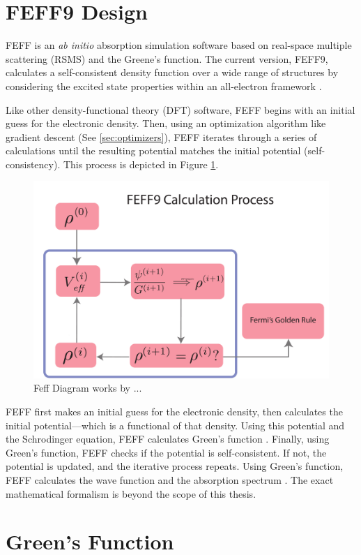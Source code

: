 \section{FEFF9 Design}

FEFF is an \textit{ab initio} absorption simulation software based on real-space multiple scattering (RSMS) and the Greene's function. The current version, FEFF9, calculates a self-consistent density function over a wide range of structures by considering the excited state properties within an
all-electron framework \cite{feff-new-dev}. 

Like other density-functional theory (DFT) software, FEFF begins with an initial guess for the electronic density. Then, using an optimization algorithm like gradient descent (See \ref{sec:optimizers}), FEFF iterates through a series of calculations until the resulting potential matches the initial potential (self-consistency). This process is depicted in Figure \ref{fig:feff-dft-diagram}.

\begin{figure}
    \centering
    \includegraphics[width=\linewidth]{Chapters/Figures/dft-feff-diagram.pdf}
    \caption[FEFF Diagram]{Feff Diagram works by ...}
    \label{fig:feff-dft-diagram}
\end{figure}

FEFF first makes an initial guess for the electronic density, then calculates the initial potential---which is a functional of that density. Using this potential and the Schrodinger equation, FEFF calculates Green's function \cite{greens-function-xafs-2021}. Finally, using Green's function, FEFF checks if the potential is self-consistent. If not, the potential is updated, and the iterative process repeats. Using Green's function, FEFF calculates the wave function and the absorption spectrum \cite{feff-citation} \cite{rehr2010parameter}. The exact mathematical formalism is beyond the scope of this thesis.

\section{Green's Function}


